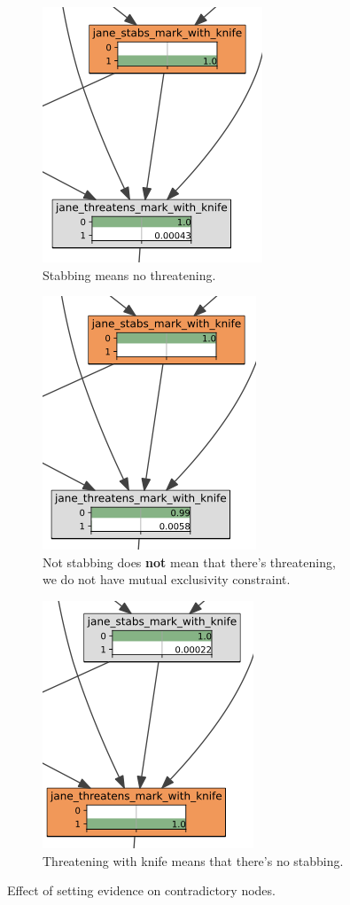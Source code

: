 \begin{itemize}
\begin{figure}[htbp]
\begin{subfigure}{.3\textwidth}
\includegraphics[scale=0.5]{images/vlekprog/e1.png}
\caption{Stabbing means no threatening.}
\label{e1}
\end{subfigure}
\begin{subfigure}{.3\textwidth}
\includegraphics[scale=0.5]{images/vlekprog/e2.png}
\caption{Not stabbing does \textbf{not} mean that there's threatening, we do not have mutual exclusivity constraint.}
\label{e2}
\end{subfigure}
\begin{subfigure}{.3\textwidth}
\includegraphics[scale=0.5]{images/vlekprog/e3.png}
\caption{Threatening with knife means that there's no stabbing.}
\label{e3}
\end{subfigure}
\caption{Effect of setting evidence on contradictory nodes.}
\label{cont}
\end{figure}


\end{itemize}

